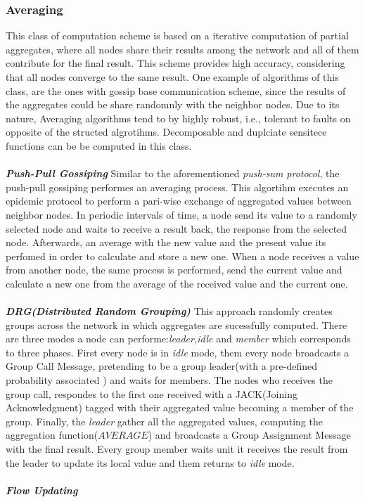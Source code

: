 \subsubsection{Averaging}
This class of computation scheme is based on a iterative computation of partial aggregates, where all nodes share their results among the network and all of them contribute for the final result. This scheme provides high accuracy, considering that all nodes converge to the same result. One example of algorithms of this class, are the ones with gossip base communication scheme, since the results of the aggregates could be share randomnly with the neighbor nodes. Due to its nature, Averaging algorithms tend to by highly robust, i.e., tolerant to faults on opposite of the structed algrotihms. Decomposable and duplciate sensitece functions can be be computed in this class.\\
\\
\textbf{\textit{Push-Pull Gossiping}} Similar to the aforementioned \textit{push-sum protocol}, the push-pull gossiping\cite{jelasity2004epidemic} performes an averaging process. This algortihm executes an epidemic protocol to perform a pari-wise exchange of aggregated values between neighbor nodes\cite{journals/corr/abs-1110-0725}. In periodic intervals of time, a node send its value to a randomly selected node and waits to receive a result back, the response from the selected node. Afterwards, an average with the new value and the present value its perfomed in order to calculate and store a new one. When a node receives a value from another node, the same process is performed, send the current value and calculate a new one from the average of the received value and the current one.\\ 
\\
\textbf{\textit{DRG(Distributed Random Grouping)}} This approach \cite{chen2006robust} randomly creates groups across the network in which aggregates are sucessfully computed. There are three modes a node can performe:\textit{leader,idle} and \textit{member} which corresponds to three phases. First every node is in \textit{idle} mode, them every node broadcasts a Group Call Message, pretending to be a group leader(with a pre-defined probability associated ) and waits for members. The nodes who receives the group call, respondes to the first one received with a JACK(Joining Acknowledgment) tagged with their aggregated value becoming a member of the group. Finally, the \textit{leader} gather all the aggregated values, computing the aggregation function($AVERAGE$) and broadcasts a Group Assignment Message with the  final result. Every group member waits unit it receives the result from the leader to update its local value and them returns to  \textit{idle} mode.\\
\\
\textbf{\textit{Flow Updating}}\\

